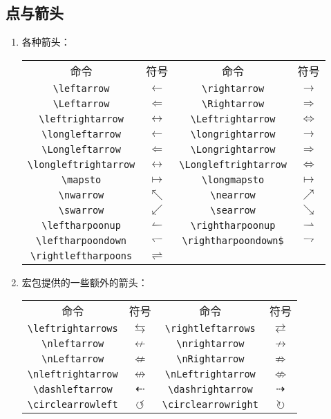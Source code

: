 \subsection{点与箭头}
\begin{multicols}{2}
\begin{enumerate}

\item 各种箭头：

\begin{tabular}{cccc}
命令 & 符号 & 命令 & 符号 \\
\verb|\leftarrow| & $\leftarrow$ & \verb|\rightarrow| & $\rightarrow$ \\ 
\verb|\Leftarrow| & $\Leftarrow$ & \verb|\Rightarrow| & $\Rightarrow$ \\ 
\verb|\leftrightarrow| & $\leftrightarrow$ & \verb|\Leftrightarrow| & $\Leftrightarrow$ \\ 
\verb|\longleftarrow| & $\longleftarrow$ & \verb|\longrightarrow| & $\longrightarrow$ \\ 
\verb|\Longleftarrow| & $\Longleftarrow$ & \verb|\Longrightarrow| & $\Longrightarrow$ \\ 
\verb|\longleftrightarrow| & $\longleftrightarrow$ & \verb|\Longleftrightarrow| & $\Longleftrightarrow$ \\ 
\verb|\mapsto| & $\mapsto$ & \verb|\longmapsto| & $\longmapsto$ \\ 
\verb|\nwarrow| & $\nwarrow$ & \verb|\nearrow| & $\nearrow$ \\ 
\verb|\swarrow| & $\swarrow$ & \verb|\searrow| & $\searrow$ \\ 
\verb|\leftharpoonup| & $\leftharpoonup$ & \verb|\rightharpoonup| & $\rightharpoonup$ \\ 
\verb|\leftharpoondown| & $\leftharpoondown$ & \verb|\rightharpoondown$| & $\rightharpoondown$ \\ 
\verb|\rightleftharpoons| & $\rightleftharpoons$ & & \\ 
\end{tabular}

\item {} 宏包提供的一些额外的箭头：

\begin{tabular}{cccc}
命令 & 符号 & 命令 & 符号 \\
\verb|\leftrightarrows| & $\leftrightarrows$ & \verb|\rightleftarrows| & $\rightleftarrows$ \\ 
\verb|\nleftarrow| & $\nleftarrow$ & \verb|\nrightarrow| & $\nrightarrow$ \\ 
\verb|\nLeftarrow| & $\nLeftarrow$ & \verb|\nRightarrow| & $\nRightarrow$ \\ 
\verb|\nleftrightarrow| & $\nleftrightarrow$ & \verb|\nLeftrightarrow| & $\nLeftrightarrow$ \\ 
\verb|\dashleftarrow| & $\dashleftarrow$ & \verb|\dashrightarrow| & $\dashrightarrow$ \\ 
\verb|\circlearrowleft| & $\circlearrowleft$ & \verb|\circlearrowright| & $\circlearrowright$ \\ 
\end{tabular}


\end{enumerate}
\end{multicols}
